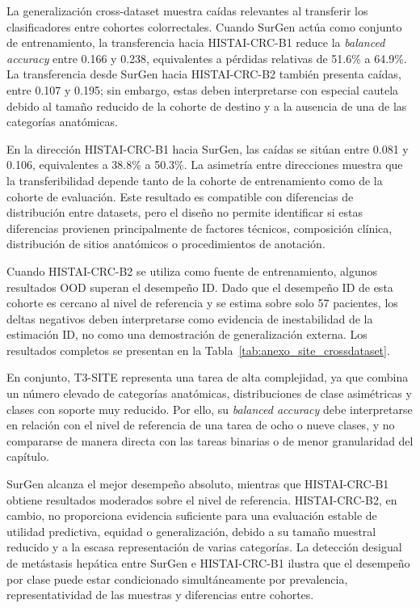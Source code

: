La generalización cross-dataset muestra caídas relevantes al transferir los clasificadores entre cohortes colorrectales. Cuando SurGen actúa como conjunto de entrenamiento, la transferencia hacia HISTAI-CRC-B1 reduce la \textit{balanced accuracy} entre 0.166 y 0.238, equivalentes a pérdidas relativas de 51.6\% a 64.9\%. La transferencia desde SurGen hacia HISTAI-CRC-B2 también presenta caídas, entre 0.107 y 0.195; sin embargo, estas deben interpretarse con especial cautela debido al tamaño reducido de la cohorte de destino y a la ausencia de una de las categorías anatómicas.

En la dirección HISTAI-CRC-B1 hacia SurGen, las caídas se sitúan entre 0.081 y 0.106, equivalentes a 38.8\% a 50.3\%. La asimetría entre direcciones muestra que la transferibilidad depende tanto de la cohorte de entrenamiento como de la cohorte de evaluación. Este resultado es compatible con diferencias de distribución entre datasets, pero el diseño no permite identificar si estas diferencias provienen principalmente de factores técnicos, composición clínica, distribución de sitios anatómicos o procedimientos de anotación.

Cuando HISTAI-CRC-B2 se utiliza como fuente de entrenamiento, algunos resultados OOD superan el desempeño ID. Dado que el desempeño ID de esta cohorte es cercano al nivel de referencia y se estima sobre solo 57 pacientes, los deltas negativos deben interpretarse como evidencia de inestabilidad de la estimación ID, no como una demostración de generalización externa. Los resultados completos se presentan en la Tabla~\ref{tab:anexo_site_crossdataset}.


En conjunto, T3-SITE representa una tarea de alta complejidad, ya que combina un número elevado de categorías anatómicas, distribuciones de clase asimétricas y clases con soporte muy reducido. Por ello, su \textit{balanced accuracy} debe interpretarse en relación con el nivel de referencia de una tarea de ocho o nueve clases, y no compararse de manera directa con las tareas binarias o de menor granularidad del capítulo.

SurGen alcanza el mejor desempeño absoluto, mientras que HISTAI-CRC-B1 obtiene resultados moderados sobre el nivel de referencia. HISTAI-CRC-B2, en cambio, no proporciona evidencia suficiente para una evaluación estable de utilidad predictiva, equidad o generalización, debido a su tamaño muestral reducido y a la escasa representación de varias categorías. La detección desigual de metástasis hepática entre SurGen e HISTAI-CRC-B1 ilustra que el desempeño por clase puede estar condicionado simultáneamente por prevalencia, representatividad de las muestras y diferencias entre cohortes.


